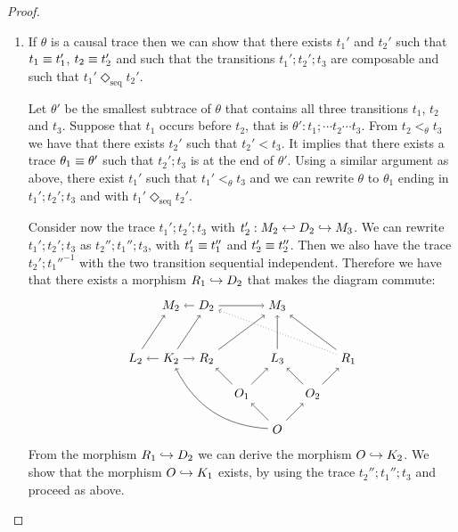 \begin{proof}
  \begin{enumerate}
  \item If $\theta$ is a causal trace then we can show that there exists $t_1'$ and $t_2'$ such that $t_1\equiv t_1'$, $t_2\equiv t_2'$ and such that the transitions $t_1';t_2';t_3$ are composable and such that $t_1'\Diamond_{\text{seq}} t_2'$.

    Let $\theta'$ be the smallest subtrace of $\theta$ that contains all three transitions $t_1$, $t_2$ and $t_3$. Suppose that $t_1$ occurs before $t_2$, that is $\theta':t_1;\cdots t_2\cdots t_3$.
    From $t_2<_{\theta} t_3$ we have that there exists $t_2'$ such that $t_2'< t_3$. It implies that there exists a trace $\theta_1\equiv\theta'$ such that $t_2';t_3$ is at the end of $\theta'$.
    Using a similar argument as above, there exist $t_1'$ such that $t_1'<_{\theta} t_3$ and we can rewrite $\theta$ to $\theta_1$ ending in $t_1';t_2';t_3$ and with $t_1'\Diamond_{\text{seq}} t_2'$.

    Consider now the trace $t_1';t_2';t_3$ with $t_2':M_2\hookleftarrow D_2 \hookrightarrow M_3$. We can rewrite $t_1';t_2';t_3$ as $t_2'';t_1'';t_3$, with $t_1'\equiv t_1''$ and $t_2'\equiv t_2''$. Then we also have the trace $t_2';t_1''^{-1}$ with the two transition sequential independent. Therefore we have that there exists a morphism $R_1\hookrightarrow D_2$ that makes the diagram commute:
    \[
    \begin{tikzpicture} %
      \node (o) at (0,-1) {\(O\)};
      \node (r3) at (0,1) {\(L_3\)};
      \node (o1) at (-1,0) {\(O_1\)};
      \node (o2) at (1,0) {\(O_2\)};
      \node (r1) at (-2,1) {\(R_2\)};
      \node (r2) at (2,1) {\(R_1\)};
      \node (k1) at (-3,1) {\(K_2\)};
      \node (l1) at (-4,1) {\(L_2\)};
      \node (m3) at (0,2.5) {\(M_3\)};
      \node (d2) at (-2,2.5) {\(D_2\)};
      \node (m2) at (-3,2.5) {\(M_2\)};
      \draw [->] (o) -- (o1);
      \draw [->] (o) -- (o2);
      \draw [->] (o1) -- (r3);
      \draw [->] (o2) -- (r3);
      \draw [->] (o1) -- (r1);
      \draw [->] (o2) -- (r2);
      \draw [->] (k1) -- (r1);
      \draw [->] (o) to [bend left] (k1);
      \draw [->] (k1) -- (l1);
      \draw [->] (d2) -- (m2);
      \draw [->] (d2) -- (m3);
      \draw [->] (k1) -- (d2);
      \draw [->] (l1) -- (m2);
      \draw [->] (r1) -- (m3);
      \draw [->] (r3) -- (m3);
      \draw [->] (r2) -- (m3);
      \draw [dotted,->] (r2) -- (d2);
    \end{tikzpicture}
    \]
    From the morphism $R_1\hookrightarrow D_2$ we can derive the morphism $O\hookrightarrow K_2$. We show that the morphism $O\hookrightarrow K_1$ exists, by using the trace $t_2'';t_1'';t_3$ and proceed as above.

  \end{enumerate}
\end{proof}


